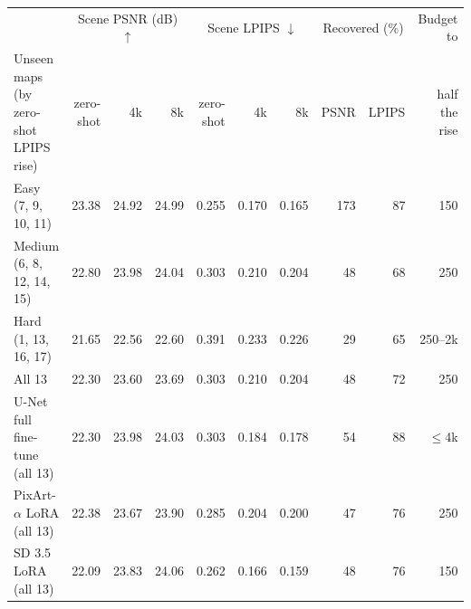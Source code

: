 \begin{tabular}{lrrrrrrrrr}
\toprule
& \multicolumn{3}{c}{Scene PSNR (dB) $\uparrow$} & \multicolumn{3}{c}{Scene LPIPS $\downarrow$} & \multicolumn{2}{c}{Recovered (\%)} & Budget to \\
\cmidrule(lr){2-4}\cmidrule(lr){5-7}\cmidrule(lr){8-9}
Unseen maps (by zero-shot LPIPS rise) & zero-shot & 4k & 8k & zero-shot & 4k & 8k & PSNR & LPIPS & half the rise \\
\midrule
Easy (7, 9, 10, 11) & 23.38 & 24.92 & 24.99 & 0.255 & 0.170 & 0.165 & 173 & 87 & 150 \\
Medium (6, 8, 12, 14, 15) & 22.80 & 23.98 & 24.04 & 0.303 & 0.210 & 0.204 & 48 & 68 & 250 \\
Hard (1, 13, 16, 17) & 21.65 & 22.56 & 22.60 & 0.391 & 0.233 & 0.226 & 29 & 65 & 250--2k \\
\midrule
All 13 & 22.30 & 23.60 & 23.69 & 0.303 & 0.210 & 0.204 & 48 & 72 & 250 \\
\midrule
U-Net full fine-tune (all 13) & 22.30 & 23.98 & 24.03 & 0.303 & 0.184 & 0.178 & 54 & 88 & ${\le}$4k \\
PixArt-$\alpha$ LoRA (all 13) & 22.38 & 23.67 & 23.90 & 0.285 & 0.204 & 0.200 & 47 & 76 & 250 \\
SD 3.5 LoRA (all 13) & 22.09 & 23.83 & 24.06 & 0.262 & 0.166 & 0.159 & 48 & 76 & 150 \\
\bottomrule
\end{tabular}
